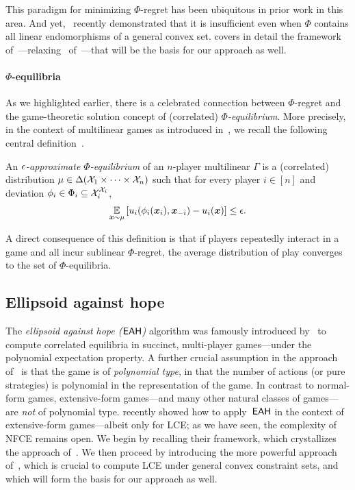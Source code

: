 This paradigm for minimizing $\Phi$-regret has been ubiquitous in prior work in this area. And yet,~\citet{Daskalakis24:Efficient} recently demonstrated that it is insufficient even when $\Phi$ contains all linear endomorphisms of a general convex set.  covers in detail the framework of~\citet{Daskalakis24:Efficient}---relaxing~ of~\citet{Gordon08:No}---that will be the basis for our approach as well.

\paragraph{$\Phi$-equilibria} As we highlighted earlier, there is a celebrated connection between $\Phi$-regret and the game-theoretic solution concept of (correlated) \emph{$\Phi$-equilibrium}. More precisely, in the context of multilinear games as introduced in~, we recall the following central definition~\citep{Stoltz07:Learning,Greenwald03:General}.

\begin{definition}
    An \emph{$\epsilon$-approximate $\Phi$-equilibrium} of an $n$-player multilinear $\Gamma$ is a (correlated) distribution $\mu \in \Delta({\mathcal{X}}_1 \times \dots \times {\mathcal{X}}_n)$ such that for every player $i \in [n]$ and deviation $\phi_i \in \Phi_i \subseteq {\mathcal{X}}_i^{{\mathcal{X}}_i}$,
\begin{align}
\operatorname*{\mathbb E}_{{\bm{x}} \sim \mu} \qty[u_i(\phi_i({\bm{x}}_i), {\bm{x}}_{-i}) - u_i({\bm{x}})] \le \epsilon. \label{eq:phi-eqm}
\end{align}
\end{definition}

A direct consequence of this definition is that if players repeatedly interact in a game and all incur sublinear $\Phi$-regret, the average distribution of play converges to the set of $\Phi$-equilibria.

\subsection{Ellipsoid against hope}
\label{sec:eah}

The \emph{ellipsoid against hope ($\textsf{EAH}$)} algorithm was famously introduced by~\citet{Papadimitriou08:Computing} to compute correlated equilibria in succinct, multi-player games---under the polynomial expectation property. A further crucial assumption in the approach of~\citet{Papadimitriou08:Computing} is that the game is of \emph{polynomial type}, in that the number of actions (or pure strategies) is polynomial in the representation of the game. In contrast to normal-form games, extensive-form games---and many other natural classes of games---are \emph{not} of polynomial type. \citet{Farina24:Polynomial} recently showed how to apply~$\textsf{EAH}$ in the context of extensive-form games---albeit only for LCE; as we have seen, the complexity of NFCE remains open. We begin by recalling their framework, which crystallizes the approach of~\citet{Papadimitriou08:Computing}. We then proceed by introducing the more powerful approach of~\citet{Daskalakis24:Efficient}, which is crucial to compute LCE under general convex constraint sets, and which will form the basis for our approach as well.

